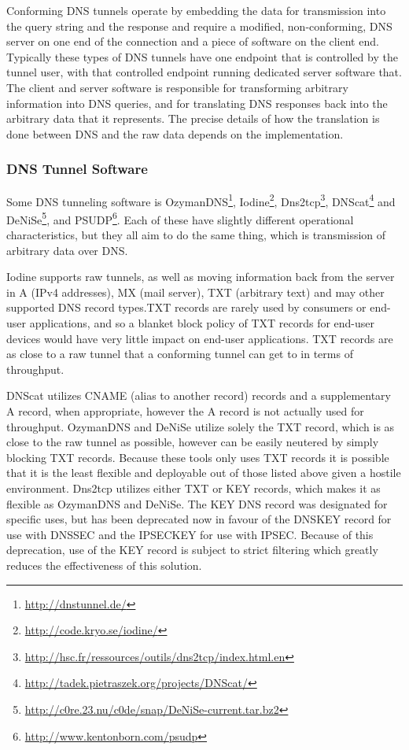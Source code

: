 \documentclass[12pt]{article}
\theoremstyle{remark}
\theoremstyle{definition}
\theoremstyle{definition}
\theoremstyle{definition}
\begin{document}
Conforming DNS tunnels operate by embedding the data for transmission into the
query string and the response and require a modified, non-conforming, DNS
server on one end of the connection and a piece of software on the client end.
Typically these types of DNS tunnels have one endpoint that is controlled by the 
tunnel user, with that controlled endpoint running dedicated server software
that. The client and server software is responsible for transforming arbitrary
information into DNS queries, and for translating DNS responses back into the
arbitrary data that it represents. The precise details of how the translation
is done between DNS and the raw data depends on the implementation.

\subsubsection{DNS Tunnel Software}

Some DNS tunneling software is OzymanDNS\footnote{\url{http://dnstunnel.de/}},
Iodine\footnote{\url{http://code.kryo.se/iodine/}},
Dns2tcp\footnote{\url{http://hsc.fr/ressources/outils/dns2tcp/index.html.en}},
DNScat\footnote{\url{http://tadek.pietraszek.org/projects/DNScat/}} and
DeNiSe\footnote{\url{http://c0re.23.nu/c0de/snap/DeNiSe-current.tar.bz2}}, and
PSUDP\footnote{\url{http://www.kentonborn.com/psudp}}. Each of these have
slightly different operational characteristics, but they all aim to do the same
thing, which is transmission of arbitrary data over DNS.

Iodine supports raw tunnels, as well as moving information back from the server
in A (IPv4 addresses), MX (mail server), TXT (arbitrary text) and may other
supported DNS record types.TXT records are rarely used by
consumers or end-user applications, and so a blanket block policy of TXT
records for end-user devices would have very little impact on end-user
applications. TXT records are as close to a raw tunnel that a conforming
tunnel can get to in terms of throughput.

DNScat utilizes CNAME (alias to
another record) records and a supplementary A record, when appropriate, however
the A record is not actually used for throughput. OzymanDNS and DeNiSe utilize
solely the
TXT record, which is as close to the raw tunnel as possible, however can be
easily neutered by simply blocking TXT records. Because these tools only uses
TXT records it is possible that it is the least flexible and deployable out of
those listed above given a hostile environment. Dns2tcp utilizes either TXT or
KEY records, which makes it as flexible as OzymanDNS and DeNiSe. The KEY DNS
record was designated for specific uses\cite{rfc2931}, but has been
deprecated now\cite{rfc3445} in favour of the DNSKEY record for use with
DNSSEC\cite{rfc3755} and the IPSECKEY for use with
IPSEC\cite{rfc4025}. Because of this deprecation, use of the KEY record is
subject to strict filtering which greatly reduces the effectiveness of this
solution.
\end{document}
